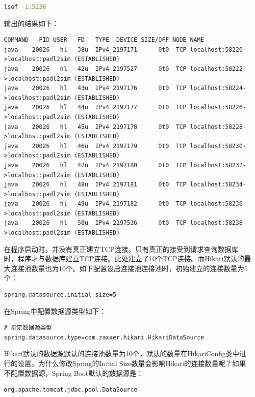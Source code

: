 \documentclass[letter]{book}
\begin{document}
\begin{lstlisting}[language=Bash]
lsof -i:5236
\end{lstlisting}

输出的结果如下：

\begin{lstlisting}
COMMAND   PID USER   FD   TYPE  DEVICE SIZE/OFF NODE NAME
java    20026   hl   38u  IPv4 2197171      0t0  TCP localhost:58220->localhost:padl2sim (ESTABLISHED)
java    20026   hl   42u  IPv4 2197527      0t0  TCP localhost:58222->localhost:padl2sim (ESTABLISHED)
java    20026   hl   43u  IPv4 2197176      0t0  TCP localhost:58224->localhost:padl2sim (ESTABLISHED)
java    20026   hl   44u  IPv4 2197177      0t0  TCP localhost:58226->localhost:padl2sim (ESTABLISHED)
java    20026   hl   45u  IPv4 2197178      0t0  TCP localhost:58228->localhost:padl2sim (ESTABLISHED)
java    20026   hl   46u  IPv4 2197179      0t0  TCP localhost:58230->localhost:padl2sim (ESTABLISHED)
java    20026   hl   47u  IPv4 2197180      0t0  TCP localhost:58232->localhost:padl2sim (ESTABLISHED)
java    20026   hl   48u  IPv4 2197181      0t0  TCP localhost:58234->localhost:padl2sim (ESTABLISHED)
java    20026   hl   49u  IPv4 2197182      0t0  TCP localhost:58236->localhost:padl2sim (ESTABLISHED)
java    20026   hl   50u  IPv4 2197536      0t0  TCP localhost:58238->localhost:padl2sim (ESTABLISHED)
\end{lstlisting}

在程序启动时，并没有真正建立TCP连接。只有真正的接受到请求查询数据库时，程序才与数据库建立TCP连接。此处建立了10个TCP连接。而Hikari默认的最大连接池数量也为10个。如下配置设启连接池连接池时，初始建立的连接数量为5个：

\begin{lstlisting}
spring.datasource.initial-size=5
\end{lstlisting}

在Spring中配置数据源类型如下：

\begin{lstlisting}
# 指定数据源类型
spring.datasource.type=com.zaxxer.hikari.HikariDataSource
\end{lstlisting}

Hikari默认的数据源默认的连接池数量为10个，默认的数量在HikariConfig类中进行的设置。为什么修改Spring的Initial Size数量会影响Hikari的连接数量呢？如果不配置数据源，Spring Boot默认的数据源是：

\begin{lstlisting}
org.apache.tomcat.jdbc.pool.DataSource
\end{lstlisting}
\end{document}

